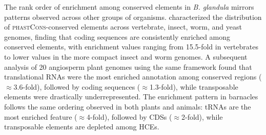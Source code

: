 \documentclass[11pt]{article}
\newcommand{\bgla}{\textit{B. glandula}\xspace}
\begin{document}
The rank order of enrichment among conserved elements in \bgla{} mirrors patterns
observed across other groups of organisms. \cite{siepel_evolutionarily_2005} characterized
the distribution of \textsc{phastCons}-conserved elements across vertebrate, insect, worm,
and yeast genomes, finding that coding sequences are consistently enriched among conserved
elements, with enrichment values ranging from 15.5-fold in vertebrates to lower values in
the more compact insect and worm genomes. A subsequent analysis of 20 angiosperm plant
genomes using the same framework \citep{hupalo_conservation_2013} found that translational
RNAs were the most enriched annotation among conserved regions ($\approx$3.6-fold),
followed by coding sequences ($\approx$1.3-fold), while transposable elements were
drastically underrepresented. The enrichment pattern in barnacles follows the same ordering
observed in both plants and animals: tRNAs are the most enriched feature
($\approx$4-fold), followed by CDSs ($\approx$2-fold), while transposable elements
are depleted among HCEs.
\vspace{0.2cm}
\end{document}
